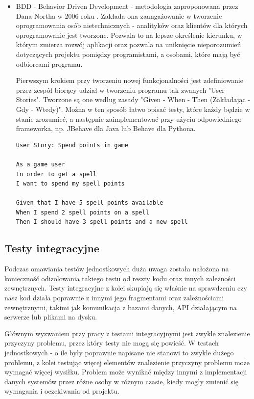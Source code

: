 \begin{itemize}
    \item BDD - Behavior Driven Development - metodologia zaproponowana przez Dana Northa w 2006 roku \cite{BehaviourDrivenDevelopment}. Zakłada ona zaangażowanie w tworzenie oprogramowania osób nietechnicznych - analityków oraz klientów dla których oprogramowanie jest tworzone. Pozwala to na lepsze określenie kierunku, w którym zmierza rozwój aplikacji oraz pozwala na uniknięcie nieporozumień dotyczących projektu pomiędzy programistami, a osobami, które mają być odbiorcami programu. 
    \par Pierwszym krokiem przy tworzeniu nowej funkcjonalności jest zdefiniowanie przez zespół biorący udział w tworzeniu programu tak zwanych "User Stories". 
    Tworzone są one według zasady "Given - When - Then (Zakładając - Gdy - Wtedy)". Można w ten sposób łatwo opisać testy, które każdy będzie w stanie zrozumieć, a następnie zaimplementować przy użyciu odpowiedniego frameworka, np. JBehave dla Java lub Behave dla Pythona. 
    
    \begin{lstlisting}[caption={Przykładowe User Story}]
User Story: Spend points in game

As a game user
In order to get a spell
I want to spend my spell points

Given that I have 5 spell points available
When I spend 2 spell points on a spell
Then I should have 3 spell points and a new spell

    \end{lstlisting}
\end{itemize}

\subsection{Testy integracyjne}
Podczas omawiania testów jednostkowych duża uwaga została nałożona na konieczność odizolowania takiego testu od reszty kodu oraz innych zależności zewnętrznych. Testy integracyjne z kolei skupiają się właśnie na sprawdzeniu czy nasz kod działa poprawnie z innymi jego fragmentami oraz zależnościami zewnętrznymi, takimi jak komunikacja z bazami danych, API działającym na serwerze lub plikami na dysku. 

Głównym wyzwaniem przy pracy z testami integracyjnymi jest zwykle znalezienie przyczyny problemu, przez który testy nie mogą się powieść. W testach jednostkowych - o ile były poprawnie napisane nie stanowi to zwykle dużego problemu, z kolei testując więcej elementów znalezienie przyczyny problemu może wymagać więcej wysiłku. Problem może wynikać między innymi z implementacji danych systemów przez różne osoby w różnym czasie, kiedy mogły zmienić się wymagania i oczekiwania od projektu.


